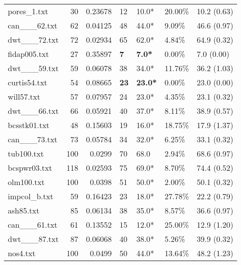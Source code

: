 \begin{table}[h]
\begin{tabular}{lrrllll}
 pores_1.txt        &      30 &     0.23678 & 12           & 10.0*           & 20.00\%  & 10.2 (0.63)    \\
 can___62.txt       &      62 &     0.04125 & 48           & 44.0*           & 9.09\%   & 46.6 (0.97)    \\
 dwt___72.txt       &      72 &     0.02934 & 65           & 62.0*           & 4.84\%   & 64.9 (0.32)    \\
 fidap005.txt       &      27 &     0.35897 & \textbf{7}   & \textbf{7.0*}   & 0.00\%   & 7.0 (0.00)     \\
 dwt___59.txt       &      59 &     0.06078 & 38           & 34.0*           & 11.76\%  & 36.2 (1.03)    \\
 curtis54.txt       &      54 &     0.08665 & \textbf{23}  & \textbf{23.0*}  & 0.00\%   & 23.0 (0.00)    \\
 will57.txt         &      57 &     0.07957 & 24           & 23.0*           & 4.35\%   & 23.1 (0.32)    \\
 dwt___66.txt       &      66 &     0.05921 & 40           & 37.0*           & 8.11\%   & 38.9 (0.57)    \\
 bcsstk01.txt       &      48 &     0.15603 & 19           & 16.0*           & 18.75\%  & 17.9 (1.37)    \\
 can___73.txt       &      73 &     0.05784 & 34           & 32.0*           & 6.25\%   & 33.1 (0.32)    \\
 tub100.txt         &     100 &     0.0299  & 70           & 68.0            & 2.94\%   & 68.6 (0.97)    \\
 bcspwr03.txt       &     118 &     0.02593 & 75           & 69.0*           & 8.70\%   & 74.4 (0.52)    \\
 olm100.txt         &     100 &     0.0398  & 51           & 50.0*           & 2.00\%   & 50.1 (0.32)    \\
 impcol_b.txt       &      59 &     0.16423 & 23           & 18.0*           & 27.78\%  & 22.2 (0.79)    \\
 ash85.txt          &      85 &     0.06134 & 38           & 35.0*           & 8.57\%   & 36.6 (0.97)    \\
 can___61.txt       &      61 &     0.13552 & 15           & 12.0*           & 25.00\%  & 12.9 (1.20)    \\
 dwt___87.txt       &      87 &     0.06068 & 40           & 38.0*           & 5.26\%   & 39.9 (0.32)    \\
 nos4.txt           &     100 &     0.0499  & 50           & 44.0*           & 13.64\%  & 48.2 (1.23)    \\

\end{tabular}
\end{table}
